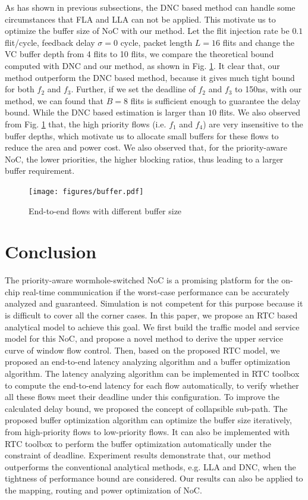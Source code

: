 \documentclass[10pt,journal]{IEEEtran}
\begin{document}
As has shown in previous subsections, the DNC based method \cite{Qian489900} can handle some circumstances that FLA and LLA can not be applied. This motivate us to optimize the buffer size of NoC with our method. Let the flit injection rate be $0.1$ flit/cycle, feedback delay $\sigma=0$ cycle, packet length $L=16$ flits and change the VC buffer depth from 4 flits to 10 flits, we compare the theoretical bound computed with DNC and our method, as shown in Fig. \ref{buffer}. It clear that, our method outperform the DNC based method, because it gives much tight bound for both $f_2$ and $f_3$. Further, if we set the deadline of $f_2$ and $f_3$ to 150ns, with our method, we can found that $B=8$ flits is sufficient enough to guarantee the delay bound. While the DNC based estimation is larger than $10$ flits. We also observed from Fig. \ref{buffer} that, the high priority flows (i.e. $f_1$ and $f_4$) are very insensitive to the buffer depths, which motivate us to allocate small buffers for these flows to reduce the area and power cost. We also observed that, for the priority-aware NoC, the lower priorities, the higher blocking ratios, thus leading to a larger buffer requirement.
\begin{figure}
  \centering
  \texttt{[image: figures/buffer.pdf]}\\
  \caption{End-to-end flows with different buffer size}\label{buffer}
\end{figure}

\section{Conclusion}\label{conclusion}
The priority-aware wormhole-switched NoC is a promising platform for the on-chip real-time communication if the worst-case performance can be accurately analyzed and guaranteed. Simulation is not competent for this purpose because it is difficult to cover all the corner cases. In this paper, we propose an RTC based analytical model to achieve this goal. We first build the traffic model and service model for this NoC, and propose a novel method to derive the upper service curve of window flow control. Then, based on the proposed RTC model, we proposed an end-to-end latency analyzing algorithm and a buffer optimization algorithm. The latency analyzing algorithm can be implemented in RTC toolbox to compute the end-to-end latency for each flow automatically, to verify whether all these flows meet their deadline under this configuration. To improve the calculated delay bound, we proposed the concept of collapsible sub-path. The proposed buffer optimization algorithm can optimize the buffer size iteratively, from high-priority flows to low-priority flows. It can also be implemented with RTC toolbox to perform the buffer optimization automatically under the constraint of deadline. Experiment results demonstrate that, our method outperforms the conventional analytical methods, e.g. LLA and DNC, when the tightness of performance bound are considered. Our results can also be applied to the mapping, routing and power optimization of NoC.
\end{document}
